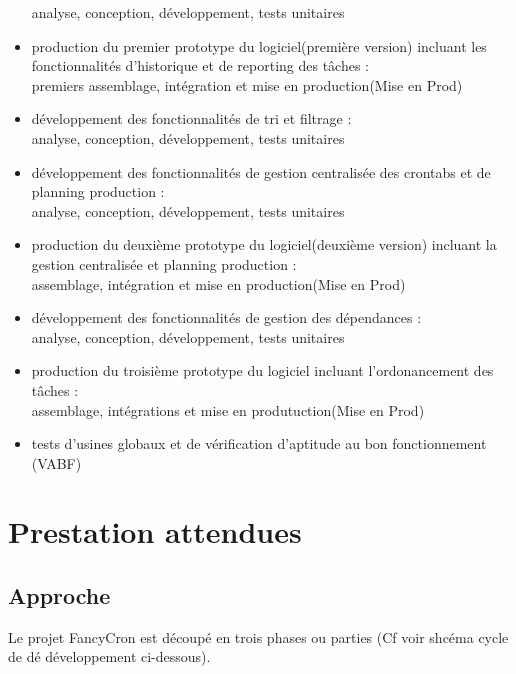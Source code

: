 \documentclass{bouygues-fr}
\begin{document}
\begin{itemize}
  analyse, conception, développement, tests unitaires
\item production du premier prototype du logiciel(première version) incluant les fonctionnalités d'historique et de reporting des tâches :\\
  premiers assemblage, intégration et mise en production(Mise en Prod)
\item développement des fonctionnalités de tri et filtrage :\\
  analyse, conception, développement, tests unitaires
\item développement des fonctionnalités de gestion centralisée des crontabs et de planning production :\\
  analyse, conception, développement, tests unitaires
\item production du deuxième prototype du logiciel(deuxième version) incluant la gestion centralisée et planning production :\\
  assemblage, intégration et mise en production(Mise en Prod)
\item développement des fonctionnalités de gestion des dépendances :\\
  analyse, conception, développement, tests unitaires
\item production du troisième prototype du logiciel incluant l'ordonancement des tâches :\\
  assemblage, intégrations et mise en produtuction(Mise en Prod)
\item tests d’usines globaux et de vérification d’aptitude au bon fonctionnement (VABF)
\end{itemize}

\newpage
\chapter{Prestation attendues}

\section {Approche}
Le  projet  FancyCron  est  découpé en trois phases ou parties (Cf voir shcéma cycle de dé développement ci-dessous).
\end{document}
